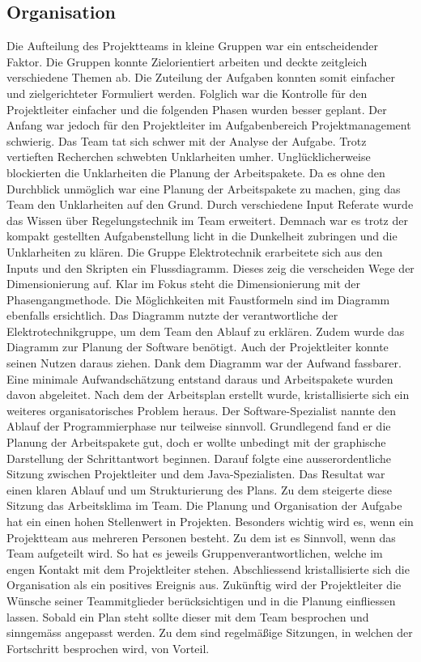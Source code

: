 \subsection{Organisation}
Die Aufteilung des Projektteams in kleine Gruppen war ein entscheidender Faktor. Die Gruppen konnte Zielorientiert arbeiten und deckte zeitgleich verschiedene Themen ab. Die Zuteilung der Aufgaben konnten somit einfacher und zielgerichteter Formuliert werden. Folglich war die Kontrolle für den Projektleiter einfacher und die folgenden Phasen wurden besser geplant. 
Der Anfang war jedoch für den Projektleiter im Aufgabenbereich Projektmanagement schwierig. Das Team tat sich schwer mit der Analyse der Aufgabe. Trotz vertieften Recherchen schwebten Unklarheiten umher. Unglücklicherweise blockierten die Unklarheiten die Planung der Arbeitspakete. Da es ohne den Durchblick unmöglich war eine Planung der Arbeitspakete zu machen, ging das Team den Unklarheiten auf den Grund. Durch verschiedene Input Referate wurde das Wissen  über Regelungstechnik im Team erweitert. Demnach war es trotz der kompakt gestellten Aufgabenstellung licht in die Dunkelheit zubringen und die Unklarheiten zu klären. Die Gruppe Elektrotechnik erarbeitete sich aus den Inputs und den Skripten ein Flussdiagramm. Dieses zeig die verscheiden Wege der Dimensionierung auf. Klar im Fokus steht die Dimensionierung mit der Phasengangmethode. Die Möglichkeiten mit Faustformeln sind im Diagramm ebenfalls ersichtlich. Das Diagramm nutzte der verantwortliche der Elektrotechnikgruppe, um dem Team den Ablauf zu erklären. Zudem wurde das Diagramm zur Planung der Software benötigt. Auch der Projektleiter konnte seinen Nutzen daraus ziehen. Dank dem Diagramm war der Aufwand fassbarer. Eine minimale Aufwandschätzung entstand daraus und Arbeitspakete wurden davon abgeleitet. Nach dem der Arbeitsplan erstellt wurde, kristallisierte sich ein weiteres organisatorisches Problem heraus. Der Software-Spezialist nannte den Ablauf der Programmierphase nur teilweise sinnvoll. Grundlegend fand er die Planung der Arbeitspakete gut, doch er wollte unbedingt mit der graphische Darstellung der Schrittantwort beginnen. Darauf folgte eine ausserordentliche Sitzung zwischen Projektleiter und dem Java-Spezialisten. Das Resultat war einen klaren Ablauf und um Strukturierung des Plans. Zu dem steigerte diese Sitzung das Arbeitsklima im Team. 
Die Planung und Organisation der Aufgabe hat ein einen hohen Stellenwert in Projekten. Besonders wichtig wird es, wenn ein Projektteam aus mehreren Personen besteht. Zu dem ist es Sinnvoll, wenn das Team aufgeteilt wird. So hat es jeweils Gruppenverantwortlichen, welche im engen Kontakt mit dem Projektleiter stehen. Abschliessend kristallisierte sich die Organisation als ein positives Ereignis aus. 
Zukünftig wird der Projektleiter die Wünsche seiner Teammitglieder berücksichtigen und in die Planung einfliessen lassen. Sobald ein Plan steht sollte dieser mit dem Team besprochen und sinngemäss angepasst werden. Zu dem sind regelmäßige Sitzungen, in welchen der Fortschritt besprochen wird, von Vorteil.
